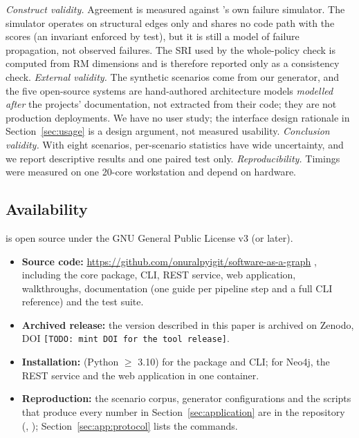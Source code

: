\emph{Construct validity.} Agreement is measured against \sag{}'s own failure simulator. The simulator operates on structural edges only and shares no code path with the scores (an invariant enforced by test), but it is still a model of failure propagation, not observed failures. The SRI used by the whole-policy check is computed from RM dimensions and is therefore reported only as a consistency check.
\emph{External validity.} The synthetic scenarios come from our generator, and the five open-source systems are hand-authored architecture models \emph{modelled after} the projects' documentation, not extracted from their code; they are not production deployments. We have no user study; the interface design rationale in Section~\ref{sec:usage} is a design argument, not measured usability.
\emph{Conclusion validity.} With eight scenarios, per-scenario statistics have wide uncertainty, and we report descriptive results and one paired test only.
\emph{Reproducibility.} Timings were measured on one 20-core workstation and depend on hardware.

\subsection{Availability}
\label{sec:availability}

\sag{} is open source under the GNU General Public License v3 (or later).
\begin{itemize}\tightlist
  \item \textbf{Source code:} \url{https://github.com/onuralpyigit/software-as-a-graph} \citep{sag-software}, including the core package, CLI, REST service, web application, walkthroughs, documentation (one guide per pipeline step and a full CLI reference) and the test suite.
  \item \textbf{Archived release:} the version described in this paper is archived on Zenodo, DOI \texttt{[TODO: mint DOI for the tool release]}.
  \item \textbf{Installation:}  (Python $\ge$ 3.10) for the package and CLI;  for Neo4j, the REST service and the web application in one container.
  \item \textbf{Reproduction:} the scenario corpus, generator configurations and the scripts that produce every number in Section~\ref{sec:application} are in the repository (, ); Section~\ref{sec:app:protocol} lists the commands.
\end{itemize}
